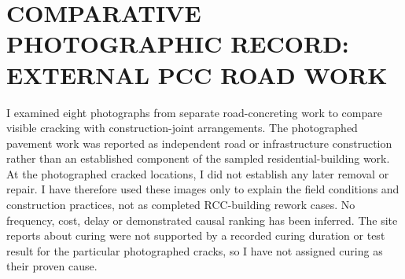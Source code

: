 \chapter{COMPARATIVE PHOTOGRAPHIC RECORD: EXTERNAL PCC ROAD WORK}
\label{app:safal-road-pcc}
I examined eight photographs from separate road-concreting work to compare visible cracking with construction-joint arrangements. The photographed pavement work was reported as independent road or infrastructure construction rather than an established component of the sampled residential-building work. At the photographed cracked locations, I did not establish any later removal or repair. I have therefore used these images only to explain the field conditions and construction practices, not as completed RCC-building rework cases. No frequency, cost, delay or demonstrated causal ranking has been inferred. The site reports about curing were not supported by a recorded curing duration or test result for the particular photographed cracks, so I have not assigned curing as their proven cause.


